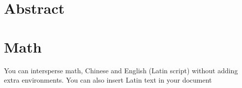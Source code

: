 \documentclass{article}
\begin{document}
\section{Abstract}
 
\section{Math}
You can intersperse math, Chinese and English (Latin script) without adding extra environments. You can also insert Latin text in your document


 
\end{document}
